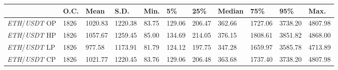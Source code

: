 \begin{tabular}{lllllllllll}
\toprule
 & \textbf{O.C.} & \textbf{Mean} & \textbf{S.D.} & \textbf{Min.} & \textbf{5\%} & \textbf{25\%} & \textbf{Median} & \textbf{75\%} & \textbf{95\%} & \textbf{Max.} \\
\midrule
\emph{ETH}/\emph{USDT} OP & 1826 & 1020.83 & 1220.38 & 83.75 & 129.06 & 206.47 & 362.66 & 1727.06 & 3738.20 & 4807.98 \\
\emph{ETH}/\emph{USDT} HP & 1826 & 1057.67 & 1259.45 & 85.00 & 134.69 & 214.05 & 376.15 & 1808.61 & 3851.82 & 4868.00 \\
\emph{ETH}/\emph{USDT} LP & 1826 & 977.58 & 1173.91 & 81.79 & 124.12 & 197.75 & 347.28 & 1659.97 & 3585.78 & 4713.89 \\
\emph{ETH}/\emph{USDT} CP & 1826 & 1021.77 & 1220.45 & 83.76 & 129.06 & 206.48 & 363.68 & 1737.40 & 3738.20 & 4807.98 \\
\bottomrule
\end{tabular}
